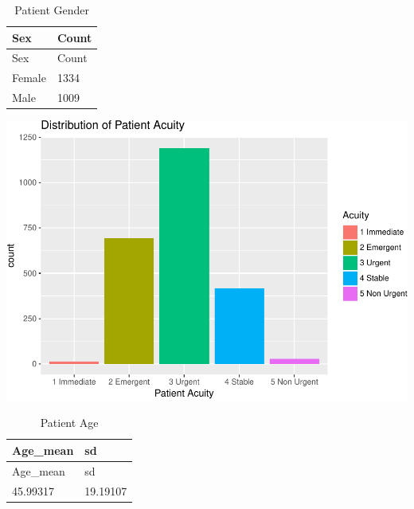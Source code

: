 \documentclass[]{elsarticle} %
\makeatletter
\def\maxwidth{\ifdim\Gin@nat@width>\linewidth\linewidth
\else\Gin@nat@width\fi}
\let\Oldincludegraphics\includegraphics
\renewcommand{\includegraphics}[1]{\Oldincludegraphics[width=\maxwidth]{#1}}
\makeatother
\begin{document}
\begin{longtable}[]{@{}ll@{}}
\caption{Patient Gender}\tabularnewline
\toprule
Sex & Count\tabularnewline
\midrule
\endfirsthead
\toprule
Sex & Count\tabularnewline
\midrule
\endhead
Female & 1334\tabularnewline
Male & 1009\tabularnewline
\bottomrule
\end{longtable}

\includegraphics{Flynn_Project_files/figure-latex/Participants-3.pdf}

\begin{longtable}[]{@{}ll@{}}
\caption{Patient Age}\tabularnewline
\toprule
Age\_mean & sd\tabularnewline
\midrule
\endfirsthead
\toprule
Age\_mean & sd\tabularnewline
\midrule
\endhead
45.99317 & 19.19107\tabularnewline
\bottomrule
\end{longtable}
\end{document}
